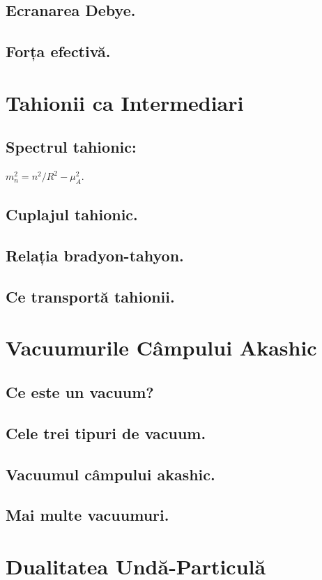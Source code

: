 \documentclass[11pt,a4paper]{article}
\begin{document}
\subsection{Ecranarea Debye.}
\subsection{Forța efectivă.}

\section{Tahionii ca Intermediari}
\subsection{Spectrul tahionic:} $m_n^2 = n^2/R^2 - \mu_A^2$.
\subsection{Cuplajul tahionic.}
\subsection{Relația bradyon-tahyon.}
\subsection{Ce transportă tahionii.}

\section{Vacuumurile Câmpului Akashic}
\subsection{Ce este un vacuum?}
\subsection{Cele trei tipuri de vacuum.}
\subsection{Vacuumul câmpului akashic.}
\subsection{Mai multe vacuumuri.}

\section{Dualitatea Undă-Particulă}
\end{document}
